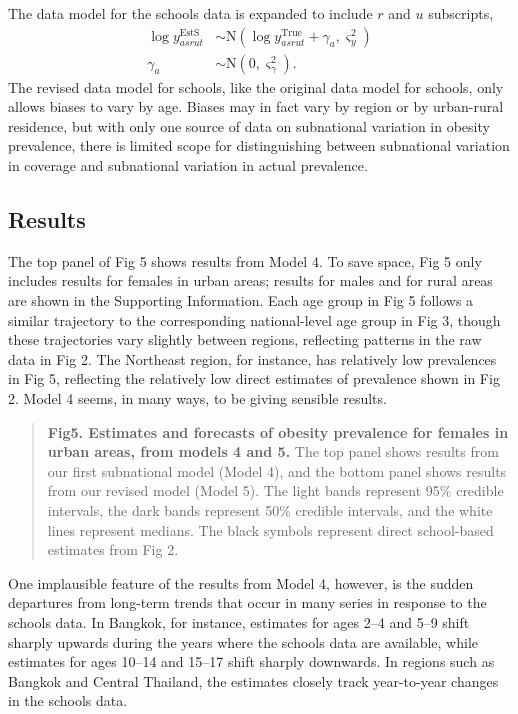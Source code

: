 \documentclass[10pt,letterpaper]{article}
\begin{document}
The data model for the schools data is expanded to include \(r\) and
\(u\) subscripts, \begin{align}
  \log y_{asrut}^{\text{EstS}} & \sim \text{N}(\log y_{asrut}^{\text{True}} + \gamma_a, \varsigma_y^2) \label{eq:likschools4} \\
  \gamma_a & \sim \text{N}(0, \varsigma_{\gamma}^2).
\end{align} The revised data model for schools, like the original data
model for schools, only allows biases to vary by age. Biases may in fact
vary by region or by urban-rural residence, but with only one source of
data on subnational variation in obesity prevalence, there is limited
scope for distinguishing between subnational variation in coverage and
subnational variation in actual prevalence.

\hypertarget{results-3}{%
\subsection{Results}\label{results-3}}

The top panel of Fig 5 shows results from Model 4. To save space, Fig 5
only includes results for females in urban areas; results for males and
for rural areas are shown in the Supporting Information. Each age group
in Fig 5 follows a similar trajectory to the corresponding
national-level age group in Fig 3, though these trajectories vary
slightly between regions, reflecting patterns in the raw data in Fig 2.
The Northeast region, for instance, has relatively low prevalences in
Fig 5, reflecting the relatively low direct estimates of prevalence
shown in Fig 2. Model 4 seems, in many ways, to be giving sensible
results.

\begin{quote}
\textbf{Fig5. Estimates and forecasts of obesity prevalence for females in urban areas, from models 4 and 5.} The top panel shows results from our first subnational model (Model 4), and the bottom panel shows results from our revised model (Model 5).  The light bands represent 95\% credible intervals, the dark bands represent 50\% credible intervals, and the white lines represent medians. The black symbols represent direct school-based estimates from Fig 2.
\end{quote}

One implausible feature of the results from Model 4, however, is the
sudden departures from long-term trends that occur in many series in
response to the schools data. In Bangkok, for instance, estimates for
ages 2--4 and 5--9 shift sharply upwards during the years where the
schools data are available, while estimates for ages 10--14 and 15--17
shift sharply downwards. In regions such as Bangkok and Central
Thailand, the estimates closely track year-to-year changes in the
schools data.
\end{document}
